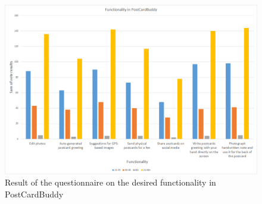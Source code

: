 \documentclass[10pt,a4paper]{article}
\begin{document}
\begin{figure}[h!]
\centering
\includegraphics[width=1.0\textwidth]{questionnaire.png}
\caption{Result of the questionnaire on the desired functionality in PostCardBuddy}
\label{fig:questionnaire}
\end{figure}


\end{document}
